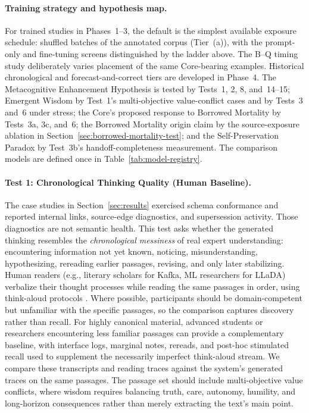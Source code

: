 \paragraph{Training strategy and hypothesis map.} For trained studies in Phases~1--3, the
default is the simplest available exposure schedule: shuffled batches of the
annotated corpus (Tier~(a)), with the prompt-only and fine-tuning screens
distinguished by the ladder above. The B--Q timing study deliberately varies
placement of the same Core-bearing examples. Historical chronological and
forecast-and-correct tiers are developed in Phase~4. The Metacognitive Enhancement Hypothesis is tested by Tests~1, 2,
8, and~14--15; Emergent Wisdom by Test~1's
multi-objective value-conflict cases and by Tests~3 and~6 under stress;
the Core's proposed response to Borrowed Mortality by Tests~3a, 3c, and~6; the
Borrowed Mortality origin claim by the source-exposure ablation in
Section~\ref{sec:borrowed-mortality-test}; and the Self-Preservation Paradox by
Test~3b's handoff-completeness measurement. The comparison models are defined
once in Table~\ref{tab:model-registry}.

\paragraph{Test 1: Chronological Thinking Quality (Human Baseline).}
The case studies in Section~\ref{sec:results} exercised schema
conformance and reported internal links, source-edge diagnostics, and
supersession activity. Those diagnostics are not semantic health. This test asks
whether the generated
thinking resembles the \emph{chronological messiness} of real expert
understanding: encountering information not yet known, noticing,
misunderstanding, hypothesizing, rereading earlier passages, revising, and only
later stabilizing. Human readers (e.g., literary scholars for Kafka, ML
researchers for LLaDA) verbalize their thought processes while reading the
same passages in order, using think-aloud protocols \cite{ericsson1984protocol}.
Where possible, participants should be domain-competent but unfamiliar with the
specific passages, so the comparison captures discovery rather than recall.
For highly canonical material, advanced students or researchers encountering
less familiar passages can provide a complementary baseline, with interface
logs, marginal notes, rereads, and post-hoc stimulated recall used to supplement
the necessarily imperfect think-aloud stream. We compare these transcripts and
reading traces against the system's generated traces on the same passages. The
passage set should include multi-objective value conflicts, where wisdom
requires balancing truth, care, autonomy, humility, and long-horizon
consequences rather than merely extracting the text's main point.

